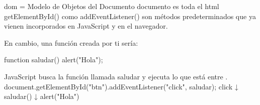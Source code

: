 dom = Modelo de Objetos del Documento
documento es toda el html
getElementById() como addEventListener() son métodos predeterminados que ya vienen incorporados 
en JavaScript y en el navegador.

En cambio, una función creada por ti sería:

function saludar() {
    alert("Hola");
}

JavaScript busca la función llamada saludar 
y ejecuta lo que está entre {}.
document.getElementById("btn").addEventListener("click", saludar);
click
 ↓
saludar()
 ↓
alert("Hola")
